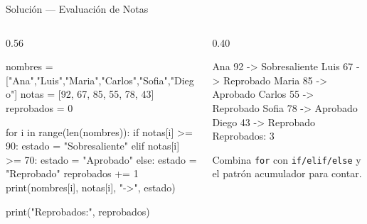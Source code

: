 \documentclass[aspectratio=169, 11pt]{beamer}
\begin{document}
\begin{frame}[fragile,shrink=35]{Solución --- Evaluación de Notas}
  \vspace{-6pt}
  \begin{columns}[T]
    \begin{column}{0.56\textwidth}
      \begin{pyblock}
nombres = ["Ana","Luis","Maria","Carlos","Sofia","Diego"]
notas   = [92, 67, 85, 55, 78, 43]
reprobados = 0

for i in range(len(nombres)):
    if notas[i] >= 90:
        estado = "Sobresaliente"
    elif notas[i] >= 70:
        estado = "Aprobado"
    else:
        estado = "Reprobado"
        reprobados += 1
    print(nombres[i], notas[i], "->", estado)

print("Reprobados:", reprobados)
      \end{pyblock}
    \end{column}

    \begin{column}{0.40\textwidth}
      \vspace{4pt}
      \begin{outputblock}
Ana 92 -> Sobresaliente
Luis 67 -> Reprobado
Maria 85 -> Aprobado
Carlos 55 -> Reprobado
Sofia 78 -> Aprobado
Diego 43 -> Reprobado
Reprobados: 3
      \end{outputblock}
      \vspace{4pt}
      {\scriptsize\color{textMuted}
        Combina \texttt{for} con \texttt{if/elif/else}
        y el patrón acumulador para contar.}
    \end{column}
  \end{columns}
\end{frame}
\end{document}
